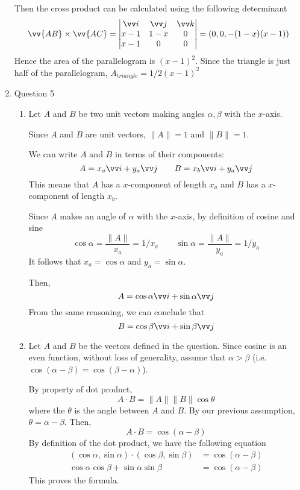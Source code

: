 \documentclass[11pt]{article}
\newcommand{\norm}[1]{\lVert #1 \rVert}
\begin{document}
\begin{enumerate}
    Then the cross product can be calculated using the following determinant
    $$
    \vv{AB} \times \vv{AC} = \begin{vmatrix}
    \vv i & \vv j & \vv k \\
    x-1 & 1-x & 0 \\
    x-1 & 0 & 0
    \end{vmatrix} = (0, 0, -(1-x)(x-1))
    $$
    Hence the area of the parallelogram is $(x-1)^2$. Since the triangle is just half of the parallelogram, $A_{triangle} = 1/2 (x-1)^2$
    
    \item Question 5 
    
    \begin{enumerate}
        \item Let $A$ and $B$ be two unit vectors making angles $\alpha, \beta$ with the $x$-axis.
        
        Since $A$ and $B$ are unit vectors, $\norm{A}=1$ and $\norm{B}=1$.
        
        We can write $A$ and $B$ in terms of their components:
        $$
        A = x_a \vv i + y_a \vv j \qquad B = x_b \vv i + y_a \vv j
        $$
        This means that $A$ has a $x$-component of length $x_a$ and $B$ has a $x$-component of length $x_b$.
        
        Since $A$ makes an angle of $\alpha$ with the $x$-axis, by definition of cosine and sine
        $$
        \cos\alpha = \frac{\norm{A}}{x_a} = 1/x_a \qquad \sin\alpha = \frac{\norm{A}}{y_a} = 1/y_a
        $$
        It follows that $x_a = \cos\alpha$ and $y_a = \sin\alpha$.
        
        Then,
        $$
        A = \cos\alpha \vv i + \sin\alpha \vv j
        $$
        From the same reasoning, we can conclude that
        $$
        B = \cos\beta \vv i + \sin\beta \vv j
        $$
        
        \item Let $A$ and $B$ be the vectors defined in the question. Since cosine is an even function, without loss of generality, assume that $\alpha > \beta$ (i.e. $\cos(\alpha-\beta) = \cos(\beta-\alpha)$).
        
        By property of dot product,
        $$
        A \cdot B = \norm{A}\norm{B}\cos\theta
        $$
        where the $\theta$ is the angle between $A$ and $B$. By our previous assumption, $\theta = \alpha - \beta$. Then,
        $$
        A \cdot B = \cos(\alpha-\beta)
        $$
        By definition of the dot product, we have the following equation
        \begin{align*}
            (\cos\alpha, \sin\alpha) \cdot (\cos\beta, \sin\beta) &= \cos(\alpha-\beta) \\
            \cos\alpha\cos\beta + \sin\alpha\sin\beta &= \cos(\alpha-\beta)
        \end{align*}
        This proves the formula.
    \end{enumerate}
    

\end{enumerate}
\end{document}
